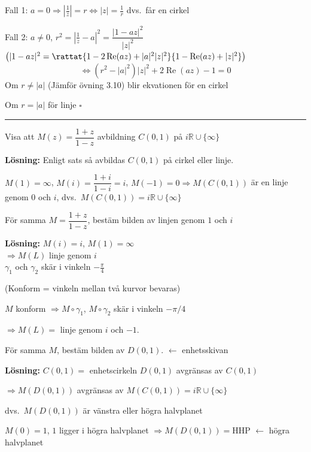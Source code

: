 \textcolor{red!70!black}{Fall 1:} $a = 0 \Rightarrow \left|\frac{1}{z}\right| = r \Leftrightarrow |z| = \frac{1}{r}$ dvs.\ får en cirkel

\textcolor{red!70!black}{Fall 2:} $a \neq 0$, $r^2 = \left|\frac{1}{z} - a\right|^2 = \dfrac{|1 - az|^2}{|z|^2}$ \quad \textcolor{red!70!black}{$\left(|1 - az|^2 = \rattat{1 - 2\operatorname{Re}(az) + |a|^2|z|^2}{1 - \operatorname{Re}(az) + |z|^2}\right)$}
\[ \Leftrightarrow (r^2 - |a|^2)|z|^2 + 2\operatorname{Re}(az) - 1 = 0 \]
\textcolor{red!70!black}{Om $r \neq |a|$} \textcolor{blue!60!black}{(Jämför övning 3.10)} blir ekvationen för en cirkel

\textcolor{red!70!black}{Om $r = |a|$} för linje \hfill $\square$

\noindent\rule{\linewidth}{0.4pt}

\begin{example}
Visa att $M(z) = \dfrac{1 + z}{1 - z}$ avbildning $C(0, 1)$ på $i\mathbb{R} \cup \{\infty\}$

\textbf{Lösning:} Enligt sats så avbildas $C(0, 1)$ på cirkel eller linje.

$M(1) = \infty$, $M(i) = \dfrac{1 + i}{1 - i} = i$, $M(-1) = 0 \Rightarrow M(C(0, 1))$ är en linje genom $0$ och $i$, dvs.\ $M(C(0, 1)) = i\mathbb{R} \cup \{\infty\}$
\end{example}

\begin{example}
För samma $M = \dfrac{1 + z}{1 - z}$, bestäm bilden av linjen genom $1$ och $i$

\textbf{Lösning:}
$M(i) = i$, $M(1) = \infty$ \\
$\Rightarrow M(L)$ linje genom $i$ \\
$\gamma_1$ och $\gamma_2$ skär i vinkeln $-\frac{\pi}{4}$

\textcolor{magenta!80!black}{(Konform = vinkeln mellan två kurvor bevaras)}

$M$ konform $\Rightarrow M \circ \gamma_1$, $M \circ \gamma_2$ skär i vinkeln $-\pi/4$

$\Rightarrow M(L) =$ linje genom $i$ och $-1$.
\end{example}

\begin{example}
För samma $M$, bestäm bilden av $D(0, 1)$. \textcolor{magenta!80!black}{$\leftarrow$ enhetsskivan}

\textbf{Lösning:} \hfill \textcolor{magenta!80!black}{$C(0, 1) =$ enhetscirkeln}
$D(0, 1)$ avgränsas av $C(0, 1)$

$\Rightarrow M(D(0, 1))$ avgränsas av $M(C(0, 1)) = i\mathbb{R} \cup \{\infty\}$

dvs.\ $M(D(0, 1))$ är vänstra eller högra halvplanet

$M(0) = 1$, $1$ ligger i högra halvplanet $\Rightarrow M(D(0, 1)) = \text{HHP}$ \textcolor{magenta!80!black}{$\leftarrow$ högra halvplanet}
\end{example}

